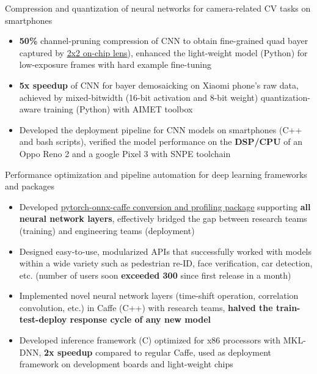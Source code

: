 \documentclass{resume}
\begin{document}
Compression and quantization of neural networks for camera-related CV tasks on smartphones
\begin{itemize}
  \item \textbf{50\%} channel-pruning compression of CNN to obtain fine-grained quad bayer captured by \href{https://www.sony-semicon.co.jp/e/products/IS/mobile/2_2_ocl.html}{\underline{2x2 on-chip lens}}), enhanced the light-weight model (Python) for low-exposure frames with hard example fine-tuning
  \item \textbf{5x speedup} of CNN for bayer demosaicking on Xiaomi phone's raw data, achieved by mixed-bitwidth (16-bit activation and 8-bit weight) quantization-aware training (Python) with AIMET toolbox
  \item Developed the deployment pipeline for CNN models on smartphones (C++ and bash scripts), verified the model performance on the \textbf{DSP/CPU} of an Oppo Reno 2 and a google Pixel 3 with SNPE toolchain
\end{itemize}
Performance optimization and pipeline automation for deep learning frameworks and packages
\begin{itemize}
  \item Developed \href{https://github.com/ModelTC/NART}{\underline{pytorch-onnx-caffe conversion and profiling package}} supporting \textbf{all neural network layers}, effectively bridged the gap between research teams (training) and engineering teams (deployment) 
  \item Designed easy-to-use, modularized APIs that successfully worked with models within a wide variety such as pedestrian re-ID, face verification, car detection, etc. (number of users soon \textbf{exceeded 300} since first release in a month)
  \item Implemented novel neural network layers (time-shift operation, correlation convolution, etc.) in Caffe (C++) with research teams, \textbf{halved the train-test-deploy response cycle of any new model} 
  \item Developed inference framework (C) optimized for x86 processors with MKL-DNN, \textbf{2x speedup} compared to regular Caffe, used as deployment framework on development boards and light-weight chips
\end{itemize} 
\end{document}
